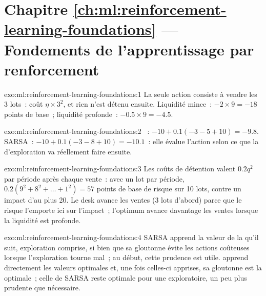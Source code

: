 \section*{Chapitre \ref{ch:ml:reinforcement-learning-foundations} --- Fondements de l'apprentissage par renforcement}

\begin{solution}{exo:ml:reinforcement-learning-foundations:1}
La seule action consiste à vendre les 3 lots~: coût $\eta\times3^2$, et rien n'est détenu ensuite. Liquidité mince~: $-2\times9 = -18$ points de
base~; liquidité profonde~: $-0.5\times9 = -4.5$.
\end{solution}

\begin{solution}{exo:ml:reinforcement-learning-foundations:2}
~: $-10 + 0.1(-3 - 5 + 10) = -9.8$. SARSA~: $-10 + 0.1(-3 - 8 + 10) = -10.1$~: elle évalue l'action selon ce que la
 d'exploration va réellement faire ensuite.
\end{solution}

\begin{solution}{exo:ml:reinforcement-learning-foundations:3}
Les coûts de détention valent $0.2q^2$ par période après chaque vente~: avec un lot par période, $0.2(9^2 + 8^2 + \dots + 1^2) = 57$ points de base de
risque sur 10 lots, contre un impact d'au plus 20. Le desk avance les ventes (3 lots d'abord) parce que le risque
l'emporte ici sur l'impact~; l'optimum avance davantage les ventes lorsque la liquidité est profonde.
\end{solution}

\begin{solution}{exo:ml:reinforcement-learning-foundations:4}
SARSA apprend la valeur de la  qu'il suit, exploration comprise, si bien que sa  gloutonne évite les actions coûteuses
lorsque l'exploration tourne mal~; au début, cette prudence est utile.  apprend directement les valeurs optimales et, une
fois celles-ci apprises, sa  gloutonne est la  optimale~; celle de SARSA reste optimale pour une  exploratoire, un peu plus prudente que
nécessaire.
\end{solution}

